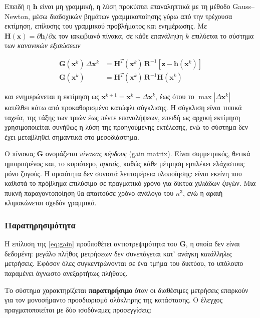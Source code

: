 Επειδή η $\mathbf{h}$ είναι μη γραμμική, η λύση προκύπτει επαναληπτικά με τη μέθοδο
Gauss--Newton, μέσω διαδοχικών βημάτων γραμμικοποίησης γύρω από την τρέχουσα εκτίμηση,
επίλυσης του γραμμικού προβλήματος και ενημέρωσης. Με
$\mathbf{H}(\mathbf{x}) = \partial \mathbf{h}/\partial \mathbf{x}$ τον ιακωβιανό πίνακα, σε
κάθε επανάληψη $k$ επιλύεται το σύστημα των \emph{κανονικών εξισώσεων}

\begin{align}
\mathbf{G}(\mathbf{x}^{k}) \, \Delta \mathbf{x}^{k}
  &= \mathbf{H}^{T}(\mathbf{x}^{k}) \, \mathbf{R}^{-1}
     \left[\mathbf{z} - \mathbf{h}(\mathbf{x}^{k})\right] \\
\mathbf{G}(\mathbf{x}^{k})
  &= \mathbf{H}^{T}(\mathbf{x}^{k}) \, \mathbf{R}^{-1} \mathbf{H}(\mathbf{x}^{k})
\label{eq:gain}
\end{align}

και ενημερώνεται η εκτίμηση ως $\mathbf{x}^{k+1} = \mathbf{x}^{k} + \Delta \mathbf{x}^{k}$,
έως ότου το $\max|\Delta \mathbf{x}^{k}|$ κατέλθει κάτω από προκαθορισμένο κατώφλι
σύγκλισης. Η σύγκλιση είναι τυπικά ταχεία, της τάξης των τριών έως πέντε επαναλήψεων,
επειδή ως αρχική εκτίμηση χρησιμοποιείται συνήθως η λύση της προηγούμενης εκτέλεσης, ενώ το
σύστημα δεν έχει μεταβληθεί σημαντικά στο μεσοδιάστημα.

Ο πίνακας $\mathbf{G}$ ονομάζεται \emph{πίνακας κέρδους} (gain matrix). Είναι συμμετρικός,
θετικά ημιορισμένος και, το κυριότερο, \emph{αραιός}, καθώς κάθε μέτρηση εμπλέκει ελάχιστους
μόνο ζυγούς. Η αραιότητα δεν συνιστά λεπτομέρεια υλοποίησης: είναι εκείνη που καθιστά το
πρόβλημα επιλύσιμο σε πραγματικό χρόνο για δίκτυα χιλιάδων ζυγών. Μια πυκνή παραγοντοποίηση
θα απαιτούσε χρόνο ανάλογο του $n^3$, ενώ η αραιή κλιμακώνεται σχεδόν γραμμικά.

\subsubsection*{Παρατηρησιμότητα}

Η επίλυση της \eqref{eq:gain} προϋποθέτει αντιστρεψιμότητα του $\mathbf{G}$, η οποία δεν
είναι δεδομένη: μεγάλο πλήθος μετρήσεων δεν συνεπάγεται κατ' ανάγκη \emph{κατάλληλες}
μετρήσεις. Εφόσον όλες συγκεντρώνονται σε ένα τμήμα του δικτύου, το υπόλοιπο παραμένει
άγνωστο ανεξαρτήτως πλήθους.

Το σύστημα χαρακτηρίζεται \textbf{παρατηρήσιμο} όταν οι διαθέσιμες μετρήσεις επαρκούν για
τον μονοσήμαντο προσδιορισμό ολόκληρης της κατάστασης. Ο έλεγχος πραγματοποιείται με δύο
ισοδύναμες προσεγγίσεις:

